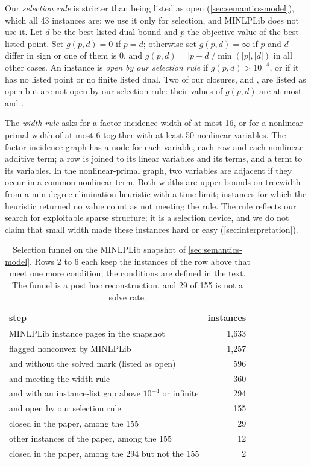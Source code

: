 Our \emph{selection rule} is stricter than being listed as open (\cref{sec:semantics-model}), which all 43 instances are; we use it only for selection, and MINLPLib does not use it.
Let $d$ be the best listed dual bound and $p$ the objective value of the best listed point.
Set $g(p,d)=0$ if $p=d$; otherwise set $g(p,d)=\infty$ if $p$ and $d$ differ in sign or one of them is $0$, and $g(p,d)=|p-d|/\min(|p|,|d|)$ in all other cases.
An instance is \emph{open by our selection rule} if $g(p,d)>10^{-4}$, or if it has no listed point or no finite listed dual.
Two of our closures,  and , are listed as open but are not open by our selection rule: their values of $g(p,d)$ are at most  and .

The \emph{width rule} asks for a factor-incidence width of at most 16, or for a nonlinear-primal width of at most 6 together with at least 50 nonlinear variables.
The factor-incidence graph has a node for each variable, each row and each nonlinear additive term; a row is joined to its linear variables and its terms, and a term to its variables.
In the nonlinear-primal graph, two variables are adjacent if they occur in a common nonlinear term.
Both widths are upper bounds on treewidth from a min-degree elimination heuristic with a time limit; instances for which the heuristic returned no value count as not meeting the rule.
The rule reflects our search for exploitable sparse structure; it is a selection device, and we do not claim that small width made these instances hard or easy (\cref{sec:interpretation}).

\begin{table}[htbp]
\centering
\small
\caption{Selection funnel on the MINLPLib snapshot of \cref{sec:semantics-model}.
Rows 2 to 6 each keep the instances of the row above that meet one more condition; the conditions are defined in the text.
The funnel is a post hoc reconstruction, and 29 of 155 is not a solve rate.}
\label{tab:results-funnel}
\begin{tabular}{@{}lr@{}}
\toprule
step & instances \\
\midrule
MINLPLib instance pages in the snapshot & 1,633 \\
\quad flagged nonconvex by MINLPLib & 1,257 \\
\quad and without the solved mark (listed as open) & 596 \\
\quad and meeting the width rule & 360 \\
\quad and with an instance-list gap above $10^{-4}$ or infinite & 294 \\
\quad and open by our selection rule & 155 \\
\midrule
closed in the paper, among the 155 & 29 \\
other instances of the paper, among the 155 & 12 \\
closed in the paper, among the 294 but not the 155 & 2 \\
\bottomrule
\end{tabular}
\end{table}


